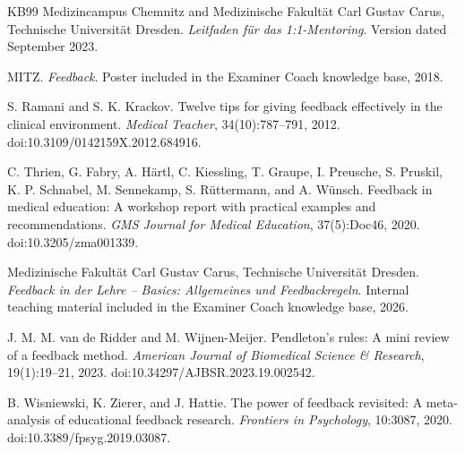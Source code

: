 \begin{thebibliography}{KB99}
Medizincampus Chemnitz and Medizinische Fakult{\"a}t Carl Gustav Carus, Technische Universit{\"a}t Dresden.
\newblock \emph{Leitfaden f{\"u}r das 1:1-Mentoring}.
\newblock Version dated September 2023.

MITZ.
\newblock \emph{Feedback}.
\newblock Poster included in the Examiner Coach knowledge base, 2018.

S. Ramani and S. K. Krackov.
\newblock Twelve tips for giving feedback effectively in the clinical environment.
\newblock \emph{Medical Teacher}, 34(10):787--791, 2012.
\newblock doi:10.3109/0142159X.2012.684916.

C. Thrien, G. Fabry, A. H{\"a}rtl, C. Kiessling, T. Graupe, I. Preusche, S. Pruskil, K. P. Schnabel, M. Sennekamp, S. R{\"u}ttermann, and A. W{\"u}nsch.
\newblock Feedback in medical education: A workshop report with practical examples and recommendations.
\newblock \emph{GMS Journal for Medical Education}, 37(5):Doc46, 2020.
\newblock doi:10.3205/zma001339.

Medizinische Fakult{\"a}t Carl Gustav Carus, Technische Universit{\"a}t Dresden.
\newblock \emph{Feedback in der Lehre -- Basics: Allgemeines und Feedbackregeln}.
\newblock Internal teaching material included in the Examiner Coach knowledge base, 2026.

J. M. M. van de Ridder and M. Wijnen-Meijer.
\newblock Pendleton's rules: A mini review of a feedback method.
\newblock \emph{American Journal of Biomedical Science \& Research}, 19(1):19--21, 2023.
\newblock doi:10.34297/AJBSR.2023.19.002542.

B. Wisniewski, K. Zierer, and J. Hattie.
\newblock The power of feedback revisited: A meta-analysis of educational feedback research.
\newblock \emph{Frontiers in Psychology}, 10:3087, 2020.
\newblock doi:10.3389/fpsyg.2019.03087.

\end{thebibliography}

